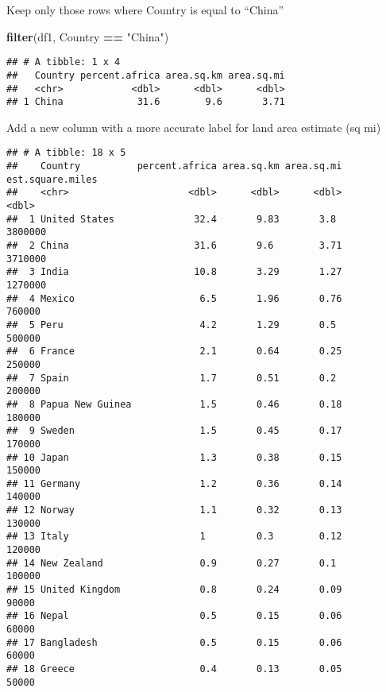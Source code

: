 \documentclass[
]{article}
\newenvironment{Shaded}{\begin{snugshade}}{\end{snugshade}}
\newcommand{\AttributeTok}[1]{\textcolor[rgb]{0.13,0.29,0.53}{#1}}
\newcommand{\DecValTok}[1]{\textcolor[rgb]{0.00,0.00,0.81}{#1}}
\newcommand{\FunctionTok}[1]{\textcolor[rgb]{0.13,0.29,0.53}{\textbf{#1}}}
\newcommand{\NormalTok}[1]{#1}
\newcommand{\SpecialCharTok}[1]{\textcolor[rgb]{0.81,0.36,0.00}{\textbf{#1}}}
\newcommand{\StringTok}[1]{\textcolor[rgb]{0.31,0.60,0.02}{#1}}
\begin{document}
Keep only those rows where Country is equal to ``China''

\begin{Shaded}
\begin{Highlighting}[]
\FunctionTok{filter}\NormalTok{(df1, Country }\SpecialCharTok{==} \StringTok{"China"}\NormalTok{)}
\end{Highlighting}
\end{Shaded}

\begin{verbatim}
## # A tibble: 1 x 4
##   Country percent.africa area.sq.km area.sq.mi
##   <chr>            <dbl>      <dbl>      <dbl>
## 1 China             31.6        9.6       3.71
\end{verbatim}

Add a new column with a more accurate label for land area estimate (sq
mi)

\begin{Shaded}
\end{Shaded}

\begin{verbatim}
## # A tibble: 18 x 5
##    Country          percent.africa area.sq.km area.sq.mi est.square.miles
##    <chr>                     <dbl>      <dbl>      <dbl>            <dbl>
##  1 United States              32.4       9.83       3.8           3800000
##  2 China                      31.6       9.6        3.71          3710000
##  3 India                      10.8       3.29       1.27          1270000
##  4 Mexico                      6.5       1.96       0.76           760000
##  5 Peru                        4.2       1.29       0.5            500000
##  6 France                      2.1       0.64       0.25           250000
##  7 Spain                       1.7       0.51       0.2            200000
##  8 Papua New Guinea            1.5       0.46       0.18           180000
##  9 Sweden                      1.5       0.45       0.17           170000
## 10 Japan                       1.3       0.38       0.15           150000
## 11 Germany                     1.2       0.36       0.14           140000
## 12 Norway                      1.1       0.32       0.13           130000
## 13 Italy                       1         0.3        0.12           120000
## 14 New Zealand                 0.9       0.27       0.1            100000
## 15 United Kingdom              0.8       0.24       0.09            90000
## 16 Nepal                       0.5       0.15       0.06            60000
## 17 Bangladesh                  0.5       0.15       0.06            60000
## 18 Greece                      0.4       0.13       0.05            50000
\end{verbatim}
\end{document}
